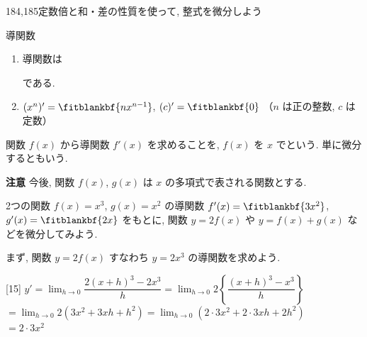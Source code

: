 \documentclass[14pt,dvipdfmx]{jsarticle}
\begin{document}
  {184,185}{定数倍と和・差の性質を使って, 整式を微分しよう}

\setcounter{theorem}{1}

\vspace{-2.0zw}%
\vspace{-0.5em}
\begin{reviewbox}{導関数}
  \begin{enumerate}[label=\textbf{\arabic*}, leftmargin=1.5zw, itemsep=0.08em]
    \item 導関数は
          \par\vspace{0.15em}
          {\renewcommand{\fitblankpad}{1.2zw}%
          }
          \mbox{である.}
          \par\vspace{0.25em}
    \item $(x^{n})'=\fitblankbf{nx^{n-1}}$,\quad
          $(c)'=\fitblankbf{0}$
          \quad（$n$ は正の整数, $c$ は定数）
  \end{enumerate}
\end{reviewbox}

\vspace{0.15em}
\vspace{-0.45em}
関数 $f(x)$ から導関数 $f'(x)$ を求めることを,
$f(x)$ を $x$ でという.
単に微分するともいう.
\par\vspace{0.2em}
\textbf{注意}\quad
今後, 関数 $f(x)$, $g(x)$ は $x$ の多項式で表される関数とする.
\par\vspace{0.3em}
2つの関数 $f(x)=x^{3}$, $g(x)=x^{2}$ の導関数
{\renewcommand{\fitblankpad}{0.7zw}%
\mbox{$f'(x)=\fitblankbf{3x^{2}}$,}\ \mbox{$g'(x)=\fitblankbf{2x}$}}
をもとに, 関数 $y=2f(x)$ や $y=f(x)+g(x)$ などを微分してみよう.
\par\vspace{0.25em}
まず, 関数 $y=2f(x)$ すなわち $y=2x^{3}$ の導関数を求めよう.
\vspace{1em}
\begin{answerbox}{}[15]
  $y'=\lim_{h \to 0}\dfrac{2(x+h)^{3}-2x^{3}}{h}
    =\lim_{h \to 0}2\left\{\dfrac{(x+h)^{3}-x^{3}}{h}\right\}$\\[0.4em]
  $=\lim_{h \to 0}2(3x^{2}+3xh+h^{2})
    =\lim_{h \to 0}(2\cdot 3x^{2}+2\cdot 3xh+2h^{2})$\\[0.4em]
  $=2\cdot 3x^{2}$
\end{answerbox}
\end{document}
